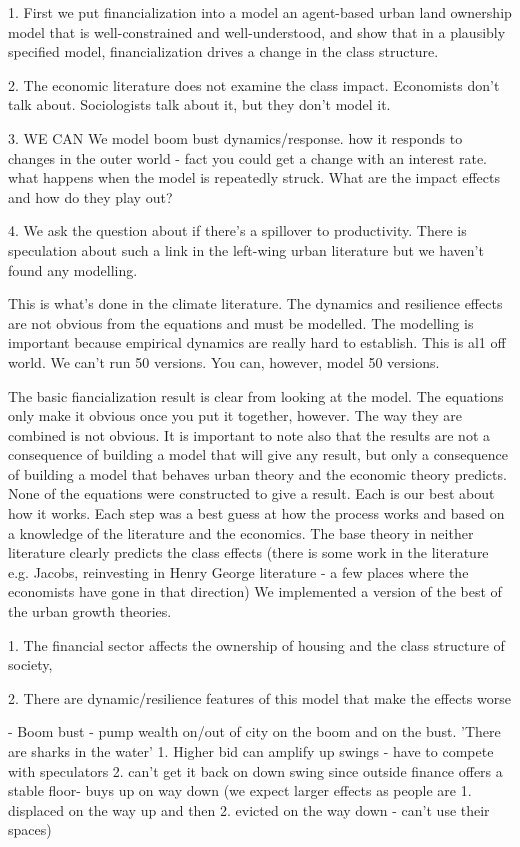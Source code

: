 1. First we put financialization into a model an agent-based urban land ownership model that is well-constrained and well-understood, and show that in a plausibly specified model, financialization drives a change in the class structure. 

2. The economic literature does not examine the class impact. Economists don't talk about. Sociologists talk about it, but they don't model it.

3. WE CAN We model boom bust dynamics/response. how it responds to changes in the outer world - fact you could get a change with an interest rate. what happens when the model is repeatedly struck. What are the impact effects and how do they play out?

4.  We ask the question about if there's a spillover to productivity. There is speculation about such a link in the left-wing urban literature but we haven't found any modelling.

This is what's done in the climate literature. The dynamics and resilience effects are not obvious from the equations and must be modelled. The modelling is important because empirical dynamics are really hard to establish. This is al1 off world. We can't run 50 versions. You can, however, model 50 versions. 

The basic fiancialization result is clear from looking at the model. The equations only make it obvious once you put it together, however. The way they are combined is not obvious.  It is important to note also that the results are not a consequence of building a model that will give any result, but only a consequence of building a model that behaves urban theory and the economic theory predicts. None of the equations were constructed to give a result. Each is our best about how it works. Each step was a best guess at how the process works and based on a knowledge of the literature and the economics. The base theory in neither literature clearly predicts the class effects (there is some work in the literature e.g. Jacobs, reinvesting in Henry George literature - a few places where the economists have gone in that direction) We implemented a version of the best of the urban growth theories.


1. The financial sector affects the ownership of housing and the class structure of society, 

2. There are dynamic/resilience features of this model that make the effects worse

- Boom bust - pump wealth on/out of city on the boom and on the bust. 'There are sharks in the water' 1. Higher bid can amplify up swings - have to compete with speculators 2. can't get it back on down swing since outside finance offers a stable floor- buys up on way down (we expect larger effects as people are 1. displaced on the way up and then 2. evicted on the way down - can't use their spaces)

